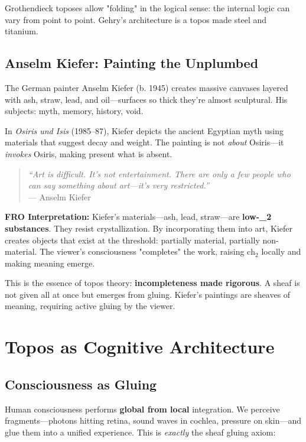 Grothendieck toposes allow "folding" in the logical sense: the internal logic can vary from point to point. Gehry's architecture is a topos made steel and titanium.

\subsection{Anselm Kiefer: Painting the Unplumbed}

The German painter Anselm Kiefer (b. 1945) creates massive canvases layered with ash, straw, lead, and oil—surfaces so thick they're almost sculptural. His subjects: myth, memory, history, void.

In \textit{Osiris und Isis} (1985–87), Kiefer depicts the ancient Egyptian myth using materials that suggest decay and weight. The painting is not \textit{about} Osiris—it \textit{invokes} Osiris, making present what is absent.

\begin{quote}
\textit{``Art is difficult. It's not entertainment. There are only a few people who can say something about art—it's very restricted.''}\\
\hspace*{\fill} --- Anselm Kiefer
\end{quote}

\textbf{FRO Interpretation:} Kiefer's materials—ash, lead, straw—are \textbf{low-_2 substances}. They resist crystallization. By incorporating them into art, Kiefer creates objects that exist at the threshold: partially material, partially non-material. The viewer's consciousness "completes" the work, raising $\text{ch}_2$ locally and making meaning emerge.

This is the essence of topos theory: \textbf{incompleteness made rigorous}. A sheaf is not given all at once but emerges from gluing. Kiefer's paintings are sheaves of meaning, requiring active gluing by the viewer.

\section{Topos as Cognitive Architecture}

\subsection{Consciousness as Gluing}

Human consciousness performs \textbf{global from local} integration. We perceive fragments—photons hitting retina, sound waves in cochlea, pressure on skin—and glue them into a unified experience. This is \textit{exactly} the sheaf gluing axiom:

